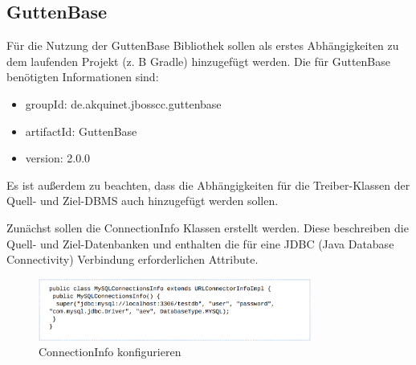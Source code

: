 \subsection{GuttenBase}
	\label{sec:imp:gb}
	Für die Nutzung der GuttenBase Bibliothek sollen als erstes Abhängigkeiten zu dem laufenden Projekt (z. B Gradle) hinzugefügt werden. Die für GuttenBase benötigten Informationen sind:
	\begin{itemize}
		\item groupId: de.akquinet.jbosscc.guttenbase
		\item artifactId: GuttenBase
		\item version: 2.0.0
	\end{itemize}
	Es ist außerdem zu beachten, dass die Abhängigkeiten für die Treiber-Klassen der Quell- und Ziel-DBMS auch hinzugefügt werden sollen.
	
	Zunächst sollen die ConnectionInfo Klassen erstellt werden. Diese beschreiben die Quell- und Ziel-Datenbanken und enthalten die für eine JDBC (Java Database Connectivity) Verbindung erforderlichen Attribute.\\
	\begin{figure}[H]
		\centering
		\includegraphics[width=0.8\textwidth]{images/gb/conInfo}
		\caption{ConnectionInfo konfigurieren}
		\label{img:gb/conInfo}
	\end{figure}
	
